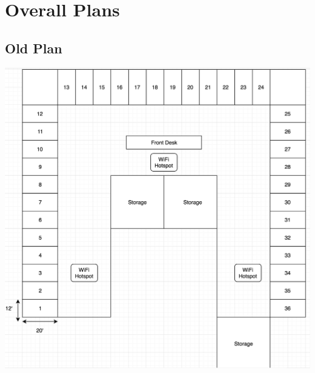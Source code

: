 \documentclass[12pt]{article}
\begin{document}
\begin{center}
	\end{center}

\section{Overall Plans}
	\subsection{Old Plan}
		\begin{center}
			\includegraphics[scale=0.6]{op.png}\\
		\end{center}
\end{document}
